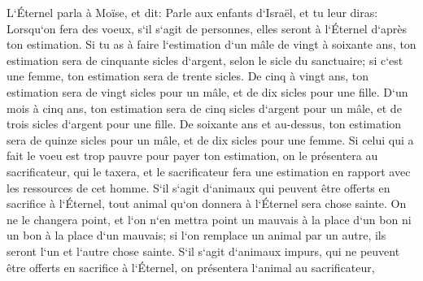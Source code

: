 \verse L`Éternel parla à Moïse, et dit: 
\verse Parle aux enfants d`Israël, et tu leur diras: Lorsqu`on fera des voeux, s`il s`agit de personnes, elles seront à l`Éternel d`après ton estimation. 
\verse Si tu as à faire l`estimation d`un mâle de vingt à soixante ans, ton estimation sera de cinquante sicles d`argent, selon le sicle du sanctuaire; 
\verse si c`est une femme, ton estimation sera de trente sicles. 
\verse De cinq à vingt ans, ton estimation sera de vingt sicles pour un mâle, et de dix sicles pour une fille. 
\verse D`un mois à cinq ans, ton estimation sera de cinq sicles d`argent pour un mâle, et de trois sicles d`argent pour une fille. 
\verse De soixante ans et au-dessus, ton estimation sera de quinze sicles pour un mâle, et de dix sicles pour une femme. 
\verse Si celui qui a fait le voeu est trop pauvre pour payer ton estimation, on le présentera au sacrificateur, qui le taxera, et le sacrificateur fera une estimation en rapport avec les ressources de cet homme. 
\verse S`il s`agit d`animaux qui peuvent être offerts en sacrifice à l`Éternel, tout animal qu`on donnera à l`Éternel sera chose sainte. 
\verse On ne le changera point, et l`on n`en mettra point un mauvais à la place d`un bon ni un bon à la place d`un mauvais; si l`on remplace un animal par un autre, ils seront l`un et l`autre chose sainte. 
\verse S`il s`agit d`animaux impurs, qui ne peuvent être offerts en sacrifice à l`Éternel, on présentera l`animal au sacrificateur, 
